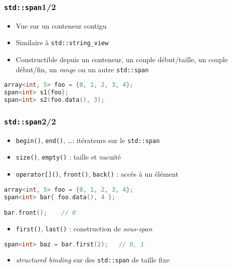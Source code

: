 \documentclass[C++.tex]{subfiles}
\begin{document}
\begin{frame}[fragile]
	\frametitle{\lstinline|std::span|\titlehfill{}1/2}
	\begin{itemize}
		\item Vue sur un conteneur contigu


		\item Similaire à \lstinline|std::string_view|
		\item Constructible depuis un conteneur, un couple début/taille, un couple début/fin, un \textit{range} ou un autre \lstinline|std::span|
	\end{itemize}

	\begin{lstlisting}[language=C++]
array<int, 5> foo = {0, 1, 2, 3, 4};
span<int> s1{foo};
span<int> s2(foo.data(), 3);\end{lstlisting}
\end{frame}

\begin{frame}[fragile]
	\frametitle{\lstinline|std::span|\titlehfill{}2/2}
	\begin{itemize}
		\item \lstinline|begin()|, \lstinline|end()|, \ldots : itérateurs sur le \lstinline|std::span|
		\item \lstinline|size()|, \lstinline|empty()| : taille et vacuité
		\item \lstinline|operator[]()|, \lstinline|front()|, \lstinline|back()| : accès à un élément
	\end{itemize}

	\begin{lstlisting}[language=C++]
array<int, 5> foo = {0, 1, 2, 3, 4};
span<int> bar{ foo.data(), 4 };

bar.front();    // 0\end{lstlisting}

	\begin{itemize}
		\item \lstinline|first()|, \lstinline|last()| : construction de \textit{sous-span}
	\end{itemize}

		\begin{lstlisting}[language=C++]
span<int> baz = bar.first(2);   // 0, 1\end{lstlisting}

	\begin{itemize}
		\item \textit{structured binding} sur des \lstinline|std::span| de taille fixe
	\end{itemize}
\end{frame}
\end{document}
